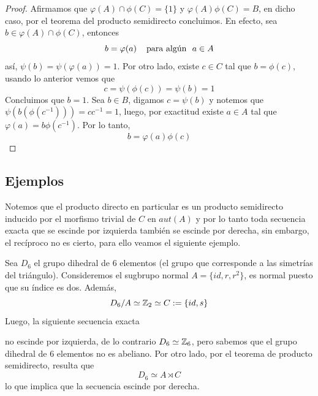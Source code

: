 \documentclass[11pt]{article}
\begin{document}
\begin{proof}
    \vspace{2mm}
    Afirmamos que $\varphi(A)\cap\phi(C)=\{1\}$ y $\varphi(A)\phi(C)=B$, en dicho caso, por el 
    teorema del producto semidirecto concluimos. En efecto, sea $b\in \varphi(A)\cap\phi(C)$, 
    entonces
    \begin{equation*}
        b=\varphi(a) \htext{para algún }a\in A
    \end{equation*}
    así, $\psi(b)=\psi(\varphi(a))=1$. Por otro lado, existe $c\in C$ tal que $b=\phi(c)$, usando
    lo anterior vemos que
    \begin{equation*}
        c=\psi(\phi(c))=\psi(b)=1
    \end{equation*}
    Concluimos que $b=1$. Sea $b\in B$, digamos $c=\psi(b)$ y notemos que $\psi(b(\phi(c^{-1})))
    =cc^{-1}=1$, luego, por exactitud existe $a\in A$ tal que $\varphi(a)=b\phi(c^{-1})$. Por lo 
    tanto,
    \begin{equation*}
        b=\varphi(a)\phi(c)
    \end{equation*}
\end{proof}

\subsection{Ejemplos}

\noindent Notemos que el producto directo en particular es un producto semidirecto inducido por el
morfismo trivial de $C$ en $aut(A)$ y por lo tanto toda secuencia exacta que se escinde por 
izquierda también se escinde por derecha, sin embargo, el recíproco no es cierto, para ello veamos
el siguiente ejemplo.

\begin{ejm}
    Sea $D_{6}$ el grupo dihedral de $6$ elementos (el grupo que corresponde a las simetrías del
    triángulo). Consideremos el sugbrupo normal $A=\{id, r, r^{2}\}$, es normal puesto que su 
    índice es dos. Además,
    \begin{equation*}
        D_{6}/A\simeq\mathbb{Z}_{2}\simeq C:=\{id,s\}
    \end{equation*}
    Luego, la siguiente secuencia exacta
    
    \vspace{2mm}
    \centerline{
    } \vspace{2mm}
    \noindent no escinde por izquierda, de lo contrario $D_{6}\simeq\mathbb{Z}_{6}$, pero sabemos que el
    grupo dihedral de $6$ elementos no es abeliano. Por otro lado, por el teorema de producto 
    semidirecto, resulta que
    \begin{equation*}
        D_{6}\simeq A\rtimes C
    \end{equation*}
    lo que implica que la secuencia escinde por derecha.
\end{ejm}
\end{document}
